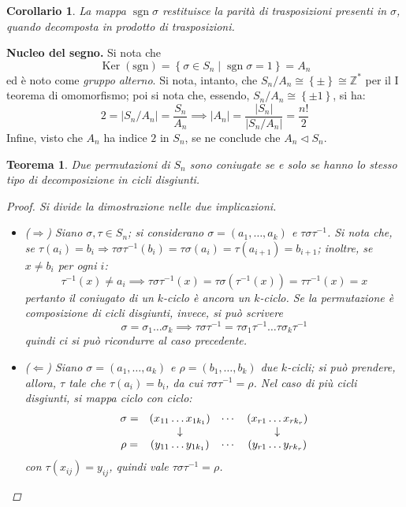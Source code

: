 \documentclass[12pt]{scrartcl}
\theoremstyle{style}
\newtheorem{teorema}{Teorema}[section]
\newtheorem{corollario}{Corollario}[teorema]
\numberwithin{equation}{subsection}
\renewcommand{\textbf}[1]{\textsf{\bfseries #1}}
\begin{document}
\begin{corollario}
	La mappa $\operatorname{sgn} \sigma $ restituisce la parit\`a di trasposizioni presenti in $\sigma $, quando decomposta in prodotto di trasposizioni.
\end{corollario}

\textbf{Nucleo del segno.} 
Si nota che 
\begin{equation}
	\operatorname{Ker} (\mathrm{sgn}) = \left\{ \sigma \in S_n  \mid \operatorname{sgn} \sigma  = 1\right\} = A_n
\end{equation}
ed \`e noto come \textit{gruppo alterno}. 
Si nota, intanto, che $S_n / A_n \cong \left\{ \pm \right\} \cong \mathbb{Z}^*$ per il I teorema di omomorfismo; poi si nota che, essendo, $S_n / A_n\cong \left\{ \pm 1 \right\} $, si ha:
\[
2 = \lvert S_n / A_n \rvert = \frac{S_n}{A_n} \implies \lvert A_n \rvert = \frac{\lvert S_n \rvert }{\lvert S_n / A_n \rvert } = \frac{n!}{2}
\] 
Infine, visto che $A_n$ ha indice $2$ in $S_n$, se ne conclude che $A_ n \lhd S_n$.
\vspace{5pt}

\begin{teorema}
	Due permutazioni di $S_n$ sono coniugate se e solo se hanno lo stesso tipo di decomposizione in cicli disgiunti.
	\begin{proof}
		Si divide la dimostrazione nelle due implicazioni.
		\begin{itemize}
			\item ($\Rightarrow $) Siano $\sigma , \tau \in S_n$; si considerano $\sigma = (a_1, \ldots, a_k)$ e $\tau \sigma \tau ^{-1}$.
				Si nota che, se $\tau (a_i) = b_i\Rightarrow \tau \sigma \tau ^{-1}(b_i) = \tau \sigma (a_i) = \tau (a_{i+1} ) =b_{i+1} $; inoltre, se $x \neq b_i $ per ogni $i$:
				\[
				\tau ^{-1}(x) \neq a_i \implies \tau \sigma \tau ^{-1}(x) = \tau \sigma \left(\tau ^{-1}(x)\right) =\tau \tau ^{-1}(x) = x
				\] 
				pertanto il coniugato di un $k$-ciclo \`e ancora un $k$-ciclo.
				Se la permutazione \`e composizione di cicli disgiunti, invece, si pu\`o scrivere 
				\[
				\sigma = \sigma _1 \ldots\sigma _k \implies \tau \sigma \tau ^{-1}= \tau \sigma _1\tau ^{-1}\ldots \tau \sigma _k\tau ^{-1}
				\] 
				quindi ci si pu\`o ricondurre al caso precedente.
			\item ($\Leftarrow$) Siano $\sigma  = (a_1,\ldots,a_k)$ e $\rho =(b_1,\ldots,b_k)$ due $k$-cicli; si pu\`o prendere, allora, $\tau $ tale che $\tau (a_i) = b_i$, da cui $\tau \sigma \tau ^{-1}=\rho $. 
				Nel caso di pi\`u cicli disgiunti, si mappa ciclo con ciclo:
				\[
				\begin{array}
					{c c c c}
					\sigma = &(x_{11} \ldots x_{1k_1} )&\cdots & (x_{r1} \ldots x_{rk_r} )\\
						 &\downarrow &  & \downarrow\\
					\rho = &(y_{11} \ldots y_{1k_1} ) & \cdots & (y_{r1} \ldots y_{r k_r} )
				\end{array}
				\] 
				con $\tau (x_{ij} ) = y_{ij} $, quindi vale $\tau \sigma \tau ^{-1}=\rho $.
		\end{itemize}
	\end{proof}
\end{teorema}
\end{document}
